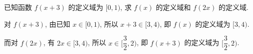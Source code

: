 \begin{example}
    已知函数 $f(x+3)$ 的定义域为 $[0,1)$, 求 $f(x)$ 的定义域和 $f(2x)$ 的定义域.
\end{example}
\begin{solution}
    对 $f(x+3)$, 由已知 $x\in[0,1)$, 所以 $x+3\in[3,4)$, 即 $f(x)$ 的定义域为 $[3,4)$.
    
    而对 $f(2x)$, 有 $2x\in[3,4)$, 所以 $x\in\biggl[\dfrac32,2\biggr)$, 即 $f(x+3)$ 的定义域为 $\biggl[\dfrac32,2\biggr)$.
\end{solution}

